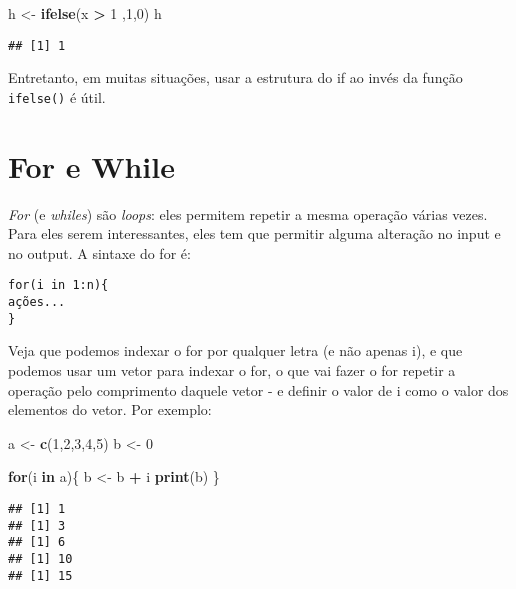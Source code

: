 \documentclass[]{book}
\newenvironment{Shaded}{\begin{snugshade}}{\end{snugshade}}
\newcommand{\KeywordTok}[1]{\textcolor[rgb]{0.13,0.29,0.53}{\textbf{#1}}}
\newcommand{\DecValTok}[1]{\textcolor[rgb]{0.00,0.00,0.81}{#1}}
\newcommand{\StringTok}[1]{\textcolor[rgb]{0.31,0.60,0.02}{#1}}
\newcommand{\ControlFlowTok}[1]{\textcolor[rgb]{0.13,0.29,0.53}{\textbf{#1}}}
\newcommand{\OperatorTok}[1]{\textcolor[rgb]{0.81,0.36,0.00}{\textbf{#1}}}
\newcommand{\NormalTok}[1]{#1}
\begin{document}
\begin{Shaded}
\begin{Highlighting}[]
\NormalTok{h <-}\StringTok{ }\KeywordTok{ifelse}\NormalTok{(x }\OperatorTok{>}\StringTok{ }\DecValTok{1}\NormalTok{ ,}\DecValTok{1}\NormalTok{,}\DecValTok{0}\NormalTok{)}
\NormalTok{h}
\end{Highlighting}
\end{Shaded}

\begin{verbatim}
## [1] 1
\end{verbatim}

Entretanto, em muitas situações, usar a estrutura do if ao invés da
função \texttt{ifelse()} é útil.

\section{For e While}\label{for-e-while}

\emph{For} (e \emph{whiles}) são \emph{loops}: eles permitem repetir a
mesma operação várias vezes. Para eles serem interessantes, eles tem que
permitir alguma alteração no input e no output. A sintaxe do for é:

\begin{verbatim}
for(i in 1:n){
ações...
}
\end{verbatim}

Veja que podemos indexar o for por qualquer letra (e não apenas i), e
que podemos usar um vetor para indexar o for, o que vai fazer o for
repetir a operação pelo comprimento daquele vetor - e definir o valor de
i como o valor dos elementos do vetor. Por exemplo:

\begin{Shaded}
\begin{Highlighting}[]
\NormalTok{a <-}\StringTok{ }\KeywordTok{c}\NormalTok{(}\DecValTok{1}\NormalTok{,}\DecValTok{2}\NormalTok{,}\DecValTok{3}\NormalTok{,}\DecValTok{4}\NormalTok{,}\DecValTok{5}\NormalTok{)}
\NormalTok{b <-}\StringTok{ }\DecValTok{0}

\ControlFlowTok{for}\NormalTok{(i }\ControlFlowTok{in}\NormalTok{ a)\{}
\NormalTok{b <-}\StringTok{ }\NormalTok{b }\OperatorTok{+}\StringTok{ }\NormalTok{i}
\KeywordTok{print}\NormalTok{(b)}
\NormalTok{\}}
\end{Highlighting}
\end{Shaded}

\begin{verbatim}
## [1] 1
## [1] 3
## [1] 6
## [1] 10
## [1] 15
\end{verbatim}
\end{document}
